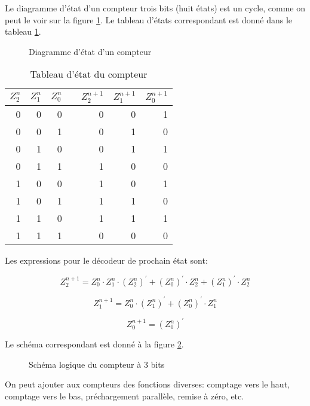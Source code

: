 \documentclass[letter, oneside]{book}
\begin{document}
\begin{enumerate}
Le diagramme d'état d'un compteur trois bits (huit états) est un
cycle, comme on peut le voir sur la figure \ref{fig:orgf5aa1c6}. Le tableau
d'états correspondant est donné dans le tableau \ref{tab:orge6793ad}.


\begin{figure}[htbp]
\centering

\caption{\label{fig:orgf5aa1c6}Diagramme d'état d'un compteur}
\end{figure}

\begin{table}[htbp]
\caption{\label{tab:orge6793ad}Tableau d'état du compteur}
\centering
\begin{tabular}{rrrlrrr}
\(Z_2^n\) & \(Z_1^n\) & \(Z_0^n\) &  & \(Z_2^{n+1}\) & \(Z_1^{n+1}\) & \(Z_0^{n+1}\)\\[0pt]
\hline
0 & 0 & 0 &  & 0 & 0 & 1\\[0pt]
0 & 0 & 1 &  & 0 & 1 & 0\\[0pt]
0 & 1 & 0 &  & 0 & 1 & 1\\[0pt]
0 & 1 & 1 &  & 1 & 0 & 0\\[0pt]
1 & 0 & 0 &  & 1 & 0 & 1\\[0pt]
1 & 0 & 1 &  & 1 & 1 & 0\\[0pt]
1 & 1 & 0 &  & 1 & 1 & 1\\[0pt]
1 & 1 & 1 &  & 0 & 0 & 0\\[0pt]
\end{tabular}
\end{table}

Les expressions pour le décodeur de prochain état sont: 

$$Z_2^{n+1} = Z_0^n \cdot Z_1^n \cdot (Z_2^{n})^\prime + (Z_0^{n})^\prime \cdot Z_2^n + (Z_1^{n})^\prime \cdot Z_2^n$$

$$Z_1^{n+1} = Z_0^{n} \cdot (Z_1^{n})^\prime + (Z_0^{n})^\prime \cdot Z_1^n$$

$$Z_0^{n+1} = (Z_0^{n})^\prime$$


Le schéma correspondant est donné à la figure \ref{fig:org446a762}.

\begin{figure}[htbp]
\centering

\caption{\label{fig:org446a762}Schéma logique du compteur à 3 bits}
\end{figure}

On peut ajouter aux compteurs des fonctions diverses: comptage vers le
haut, comptage vers le bas, préchargement parallèle, remise à zéro,
etc.


\end{enumerate}
\end{document}
